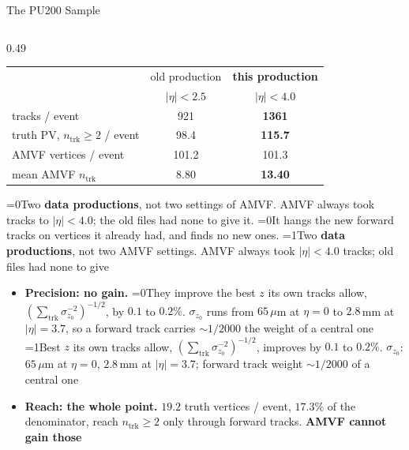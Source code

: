 \documentclass[xcolor=table,aspectratio=169]{beamer}
\newcommand{\ntrk}{\ensuremath{n_\mathrm{trk}}}
\providecommand{\talkbuild}{0}
\newcommand{\readingonly}[1]{\ifnum\talkbuild=0\relax#1\fi}
\newcommand{\talkonly}[1]{\ifnum\talkbuild=1\relax#1\fi}
\begin{document}
\begin{frame}{The PU200 Sample}
\begin{columns}[t]
\begin{column}{0.49\linewidth}
            \begin{tabular}{lcc}
                \toprule
                 & old production & \textbf{this production} \\
                 & \textcolor{black!55}{$|\eta|<2.5$}
                 & \textcolor{black!55}{$|\eta|<4.0$} \\
                \midrule
                tracks / event                   & 921   & \textbf{1361} \\
                truth PV, $\ntrk\ge2$ / event    & 98.4  & \textbf{115.7} \\
                AMVF vertices / event            & 101.2 & 101.3 \\
                mean AMVF \ntrk                  & 8.80  & \textbf{13.40} \\
                \bottomrule
            \end{tabular}
            \vspace{0.55em}

            \raggedright
            \readingonly{Two \textbf{data productions}, not two settings of AMVF. AMVF always took
            tracks to $|\eta|<4.0$; the old files had none to give it. \readingonly{It
            hangs the new forward tracks on vertices it already had, and finds no new
            ones.}}%
            \talkonly{Two \textbf{data productions}, not two AMVF settings. AMVF always
            took $|\eta|<4.0$ tracks; old files had none to give}
            \vspace{0.4em}
            \begin{itemize}\setlength\itemsep{0.3em}
                \item \textbf{Precision: no gain.} \readingonly{They improve the best $z$ its own
                    tracks allow, $(\sum_\text{trk}\sigma_{z_0}^{-2})^{-1/2}$, by $0.1$
                    to $0.2\%$. $\sigma_{z_0}$ runs from $65\,\mu$m at $\eta=0$ to
                    $2.8$\,mm at $|\eta|=3.7$, so a forward track carries ${\sim}1/2000$
                    the weight of a central one}%
                    \talkonly{Best $z$ its own tracks allow,
                    $(\sum_\text{trk}\sigma_{z_0}^{-2})^{-1/2}$, improves by $0.1$ to
                    $0.2\%$. $\sigma_{z_0}$: $65\,\mu$m at $\eta=0$, $2.8$\,mm at
                    $|\eta|=3.7$; forward track weight ${\sim}1/2000$ of a central one}
                \item \textbf{Reach: the whole point.} $\mathbf{19.2}$ truth vertices /
                    event, $17.3\%$ of the denominator, reach $\ntrk\ge2$ only through
                    forward tracks. \textbf{AMVF cannot gain those}
            \end{itemize}
        \end{column}
    \end{columns}
\end{frame}
\end{document}
